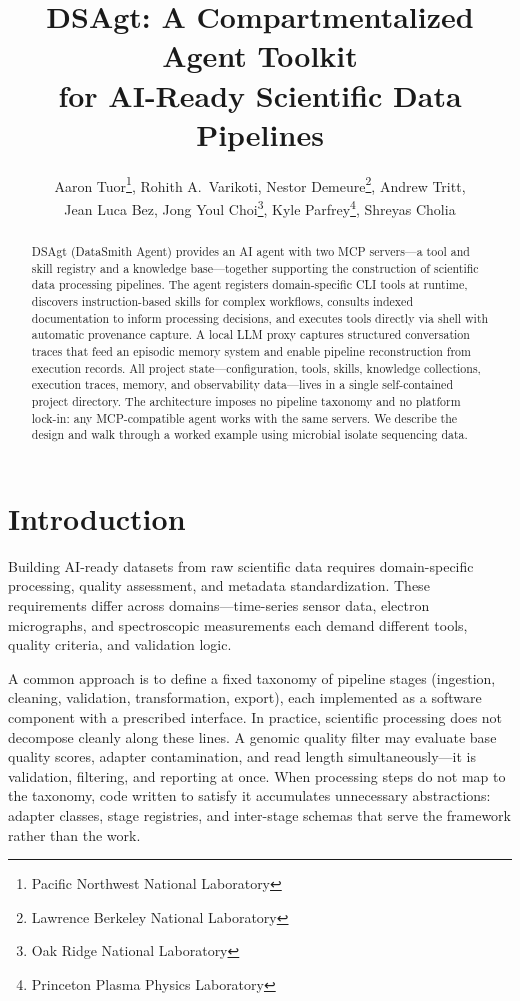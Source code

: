 \documentclass[11pt]{article}
\title{DSAgt: A Compartmentalized Agent Toolkit\\
       for AI-Ready Scientific Data Pipelines}
\author{
  Aaron Tuor\thanks{Pacific Northwest National Laboratory},
  Rohith A.\ Varikoti\footnotemark[1],
  Nestor Demeure\thanks{Lawrence Berkeley National Laboratory},
  Andrew Tritt\footnotemark[2],\\
  Jean Luca Bez\footnotemark[2],
  Jong Youl Choi\thanks{Oak Ridge National Laboratory},
  Kyle Parfrey\thanks{Princeton Plasma Physics Laboratory},
  Shreyas Cholia\footnotemark[2]
}
\date{}
\begin{document}
\maketitle


\begin{abstract}
DSAgt (DataSmith Agent) provides an AI agent with two
MCP servers---a tool and skill registry and a knowledge
base---together supporting the construction of scientific
data processing pipelines.
The agent registers domain-specific CLI tools at runtime,
discovers instruction-based skills for complex workflows,
consults indexed documentation to inform processing decisions,
and executes tools directly via shell with automatic
provenance capture.
A local LLM proxy captures structured conversation traces
that feed an episodic memory system and enable pipeline
reconstruction from execution records.
All project state---configuration, tools, skills, knowledge
collections, execution traces, memory, and observability
data---lives in a single self-contained project directory.
The architecture imposes no pipeline taxonomy and no platform
lock-in: any MCP-compatible agent works with the same servers.
We describe the design and walk through a worked example using
microbial isolate sequencing data.
\end{abstract}


\section{Introduction}

Building AI-ready datasets from raw scientific data requires
domain-specific processing, quality assessment, and metadata
standardization.
These requirements differ across domains---time-series sensor
data, electron micrographs, and spectroscopic measurements
each demand different tools, quality criteria, and validation
logic.

A common approach is to define a fixed taxonomy of pipeline
stages (ingestion, cleaning, validation, transformation,
export), each implemented as a software component with a
prescribed interface.
In practice, scientific processing does not decompose cleanly
along these lines.
A genomic quality filter may evaluate base quality scores,
adapter contamination, and read length simultaneously---it is
validation, filtering, and reporting at once.
When processing steps do not map to the taxonomy, code written
to satisfy it accumulates unnecessary abstractions: adapter
classes, stage registries, and inter-stage schemas that serve
the framework rather than the work.
\end{document}

